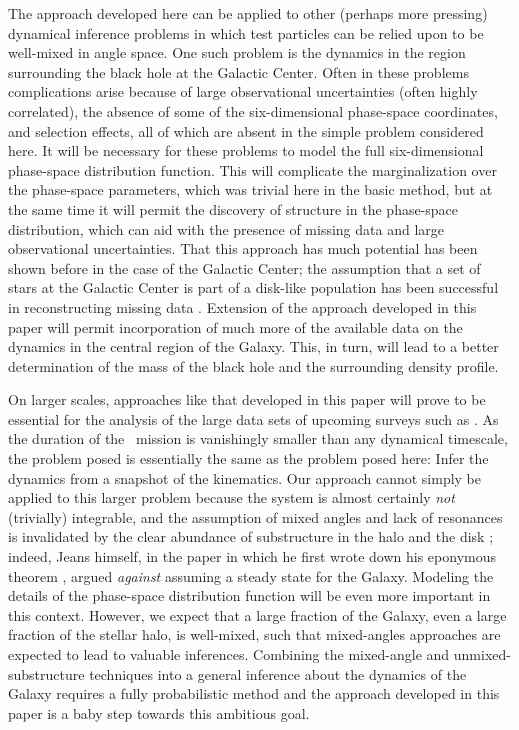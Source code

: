 The approach developed here can be applied to other (perhaps more
pressing) dynamical inference problems in which test particles can be
relied upon to be well-mixed in angle space. One such problem is the
dynamics in the region surrounding the black hole at the Galactic
Center. Often in these problems complications arise because of large
observational uncertainties (often highly correlated), the absence of
some of the six-dimensional phase-space coordinates, and selection
effects, all of which are absent in the simple problem considered
here.  It will be necessary for these problems to model the full
six-dimensional phase-space distribution function.  This will
complicate the marginalization over the phase-space parameters, which
was trivial here in the basic method, but at the same time it will
permit the discovery of structure in the phase-space distribution,
which can aid with the presence of missing data and large
observational uncertainties.  That this approach has much potential
has been shown before in the case of the Galactic Center; the
assumption that a set of stars at the Galactic Center is part of a
disk-like population has been successful in reconstructing missing
data \citep{Beloborodov06a}. Extension of the approach developed in
this paper will permit incorporation of much more of the available
data on the dynamics in the central region of the Galaxy.  This, in
turn, will lead to a better determination of the mass of the black
hole and the surrounding density profile.

On larger scales, approaches like that developed in this paper will
prove to be essential for the analysis of the large data sets of
upcoming surveys such as \Gaia. As the duration of the \Gaia\ mission
is vanishingly smaller than any dynamical timescale, the problem posed
is essentially the same as the problem posed here: Infer the dynamics
from a snapshot of the kinematics.  Our approach cannot simply be
applied to this larger problem because the system is almost certainly
\emph{not} (trivially) integrable, and the assumption of mixed angles
and lack of resonances is invalidated by the clear abundance of
substructure in the halo \citep[\eg,
][]{willman,belokurovfield,belokurov,koposov} and the disk
\citep{1998AJ....115.2384D,Bovyveldist}; indeed, Jeans himself, in the paper in
which he first wrote down his eponymous theorem \citep{Jeans15a},
argued \emph{against} assuming a steady state for the Galaxy.
Modeling the details of the phase-space distribution function will be
even more important in this context.  However, we expect that a large
fraction of the Galaxy, even a large fraction of the stellar halo, is
well-mixed, such that mixed-angles approaches are expected to lead to
valuable inferences. Combining the mixed-angle and
unmixed-substructure techniques into a general inference about the
dynamics of the Galaxy requires a fully probabilistic method and the
approach developed in this paper is a baby step towards this ambitious
goal.


